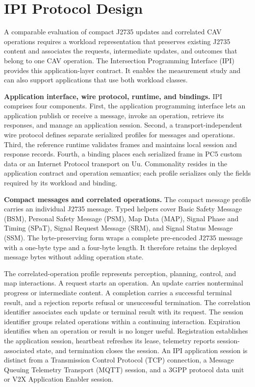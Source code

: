 \section{IPI Protocol Design}
\label{sec:ipi}

A comparable evaluation of compact J2735 updates and correlated CAV operations
requires a workload representation that preserves existing J2735 content and
associates the requests, intermediate updates, and outcomes that belong to one
CAV operation. The Intersection Programming Interface (IPI) provides this
application-layer contract. It enables the measurement study and can also
support applications that use both workload classes.

\textbf{Application interface, wire protocol, runtime, and bindings.}
IPI comprises four components. First, the application programming interface
lets an application publish or receive a message, invoke an operation, retrieve
its responses, and manage an application session. Second, a
transport-independent wire protocol defines separate serialized profiles for
messages and operations. Third, the reference runtime validates frames and
maintains local session and response records. Fourth, a binding places each
serialized frame in PC5 custom data or an Internet Protocol transport on Uu.
Commonality resides in the application contract and operation semantics; each
profile serializes only the fields required by its workload and binding.

\textbf{Compact messages and correlated operations.}
The compact message profile carries an individual J2735 message. Typed helpers
cover Basic Safety Message (BSM), Personal Safety Message (PSM), Map Data (MAP),
Signal Phase and Timing (SPaT), Signal Request Message (SRM), and Signal Status
Message (SSM). The byte-preserving form wraps a complete pre-encoded J2735
message with a one-byte type and a four-byte length. It therefore retains the
deployed message bytes without adding operation state.

The correlated-operation profile represents perception, planning, control, and
map interactions. A request starts an operation. An update carries nonterminal
progress or intermediate content. A completion carries a successful terminal
result, and a rejection reports refusal or unsuccessful termination. The
correlation identifier associates each update or terminal result with its
request. The session identifier groups related operations within a continuing
interaction. Expiration identifies when an operation or result is no longer
useful. Registration establishes the application session, heartbeat refreshes
its lease, telemetry reports session-associated state, and termination closes
the session. An IPI application session is distinct from a Transmission Control
Protocol (TCP) connection, a Message Queuing Telemetry Transport (MQTT) session,
and a 3GPP protocol data unit or V2X Application Enabler session.

